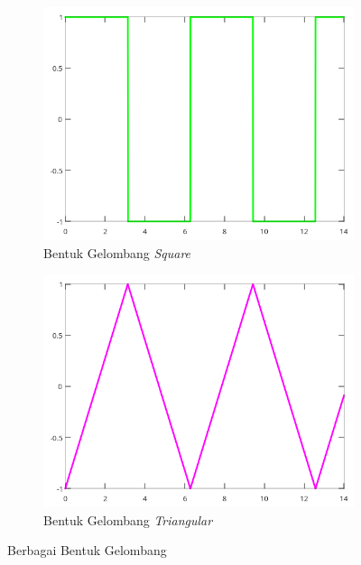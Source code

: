 \begin{figure}
\begin{center}
\begin{subfigure}[b]{0.3\linewidth}
		\end{subfigure}
		\begin{subfigure}[b]{0.3\linewidth}
			\includegraphics[width=\linewidth]{pics/bab2/gelsquare.png}
			\caption[Gelombang \textit{Square}]{Bentuk Gelombang \textit{Square}}
		\end{subfigure}
		\begin{subfigure}[b]{0.3\linewidth}
		\includegraphics[width=\linewidth]{pics/bab2/geltriangular.png}
		\caption[Gelombang \textit{Triangular}]{Bentuk Gelombang \textit{Triangular}}
		\end{subfigure}
		\caption[Berbagai Bentuk Gelombang]{Berbagai Bentuk Gelombang}
		\label{pic:bentukGelombang}
	\end{center}
\end{figure}

